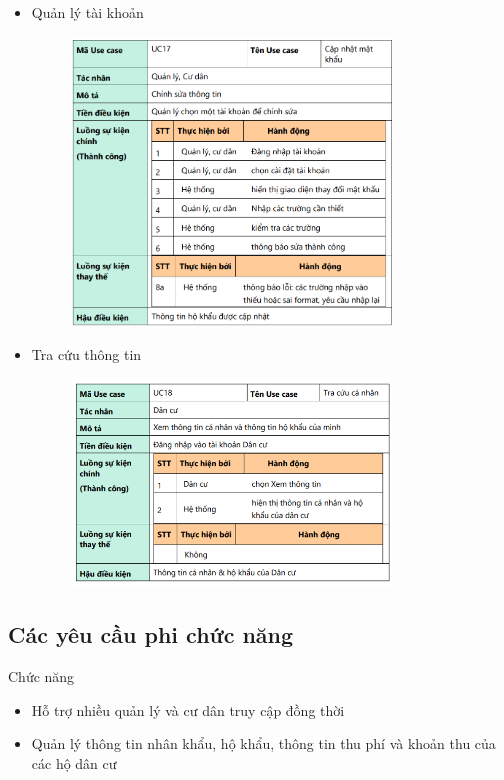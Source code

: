 \documentclass{article}
\begin{document}
\begin{itemize}
\begin{figure}[H]
    \end{figure}
    \item Quản lý tài khoản
    \begin{figure}[H]
        \centering
        \includegraphics[width=0.8\textwidth]{Ảnh chương 2/UC17.png}
    \end{figure}
    \item Tra cứu thông tin
    \begin{figure}[H]
        \centering
        \includegraphics[width=0.8\textwidth]{Ảnh chương 2/UC18.png}
    \end{figure}
\end{itemize}
\vspace{1cm}
\subsection{Các yêu cầu phi chức năng}
Chức năng
\begin{itemize}
    \item Hỗ trợ nhiều quản lý và cư dân truy cập đồng thời
    \item Quản lý thông tin nhân khẩu, hộ khẩu, thông tin thu phí và khoản thu của các hộ dân cư
\end{itemize}
\end{document}
